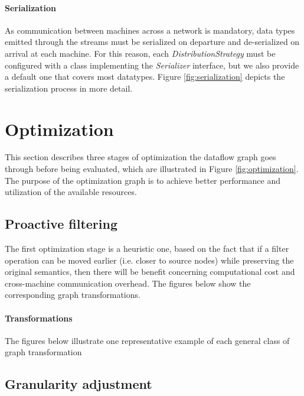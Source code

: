 \documentclass[sigplan,review,anonymous]{acmart}
\begin{document}
\paragraph{Serialization}
As communication between machines across a network is mandatory, data types
emitted through the streams must be serialized on departure and de-serialized on
arrival at each machine. For this reason, each \textit{DistributionStrategy}
must be configured with a class implementing the \textit{Serializer} interface,
but we also provide a default one that covers most datatypes. Figure \ref{fig:serialization}
depicts the serialization process in more detail.


\section{Optimization} \label{sec:optimization}

This section describes three stages of optimization the dataflow graph goes
through before being evaluated, which are illustrated in Figure \ref{fig:optimization}.
The purpose of the optimization graph is to achieve better performance and
utilization of the available resources.


\subsection{Proactive filtering}

The first optimization stage is a heuristic one, based on the fact that if a
filter operation can be moved earlier (i.e. closer to source nodes) while
preserving the original semantics, then there will be benefit concerning
computational cost and cross-machine communication overhead. The figures below
show the corresponding graph transformations.

\paragraph{Transformations}
The figures below illustrate one representative example of each general class of
graph transformation


\subsection{Granularity adjustment}
\end{document}
